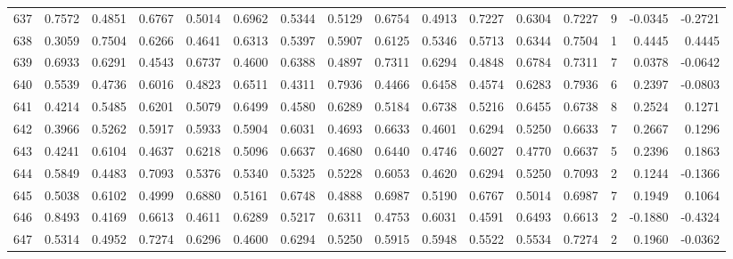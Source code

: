 \begin{tabular}{lrrrrrrrrrrrrrrr}
637 &      0.7572 &  0.4851 &  0.6767 &  0.5014 &  0.6962 &  0.5344 &  0.5129 &  0.6754 &  0.4913 &  0.7227 &   0.6304 &     0.7227 &      9 &                   -0.0345 &                    -0.2721 \\
638 &      0.3059 &  0.7504 &  0.6266 &  0.4641 &  0.6313 &  0.5397 &  0.5907 &  0.6125 &  0.5346 &  0.5713 &   0.6344 &     0.7504 &      1 &                    0.4445 &                     0.4445 \\
639 &      0.6933 &  0.6291 &  0.4543 &  0.6737 &  0.4600 &  0.6388 &  0.4897 &  0.7311 &  0.6294 &  0.4848 &   0.6784 &     0.7311 &      7 &                    0.0378 &                    -0.0642 \\
640 &      0.5539 &  0.4736 &  0.6016 &  0.4823 &  0.6511 &  0.4311 &  0.7936 &  0.4466 &  0.6458 &  0.4574 &   0.6283 &     0.7936 &      6 &                    0.2397 &                    -0.0803 \\
641 &      0.4214 &  0.5485 &  0.6201 &  0.5079 &  0.6499 &  0.4580 &  0.6289 &  0.5184 &  0.6738 &  0.5216 &   0.6455 &     0.6738 &      8 &                    0.2524 &                     0.1271 \\
642 &      0.3966 &  0.5262 &  0.5917 &  0.5933 &  0.5904 &  0.6031 &  0.4693 &  0.6633 &  0.4601 &  0.6294 &   0.5250 &     0.6633 &      7 &                    0.2667 &                     0.1296 \\
643 &      0.4241 &  0.6104 &  0.4637 &  0.6218 &  0.5096 &  0.6637 &  0.4680 &  0.6440 &  0.4746 &  0.6027 &   0.4770 &     0.6637 &      5 &                    0.2396 &                     0.1863 \\
644 &      0.5849 &  0.4483 &  0.7093 &  0.5376 &  0.5340 &  0.5325 &  0.5228 &  0.6053 &  0.4620 &  0.6294 &   0.5250 &     0.7093 &      2 &                    0.1244 &                    -0.1366 \\
645 &      0.5038 &  0.6102 &  0.4999 &  0.6880 &  0.5161 &  0.6748 &  0.4888 &  0.6987 &  0.5190 &  0.6767 &   0.5014 &     0.6987 &      7 &                    0.1949 &                     0.1064 \\
646 &      0.8493 &  0.4169 &  0.6613 &  0.4611 &  0.6289 &  0.5217 &  0.6311 &  0.4753 &  0.6031 &  0.4591 &   0.6493 &     0.6613 &      2 &                   -0.1880 &                    -0.4324 \\
647 &      0.5314 &  0.4952 &  0.7274 &  0.6296 &  0.4600 &  0.6294 &  0.5250 &  0.5915 &  0.5948 &  0.5522 &   0.5534 &     0.7274 &      2 &                    0.1960 &                    -0.0362 \\

\end{tabular}
